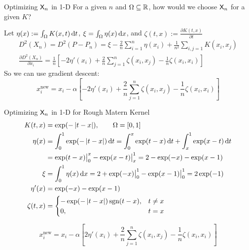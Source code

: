 \documentclass[10pt,compress,xcolor={usenames,dvipsnames},aspectratio=169]{beamer}
\begin{document}
\begin{frame}{Optimizing $\mathsf{X}_n$ in 1-D}
	For a given $n$ and $\Omega \subseteq \mathbb{R}$, how would we choose $\mathsf{X}_n$ for a given $K$?  
	
	Let $\eta(x) := \int_\Omega K(x,t) \, {\rm d} t$, $\xi = \int_\Omega \eta(x) \, {\rm d} x$, and $\zeta(t,x) := \frac{\partial K(t,x)}{\partial t}$
	\begin{gather*}
		 D^2(X_n) = D^2(P-P_n) = \xi - \frac 2{n} \sum_{i=1}^n  \eta(x_i) + \frac 1{n^2} \sum_{i,j=1}K(x_i,x_j) \\
		 \frac{\partial D^2(X_n)}{\partial x_i} = \frac {1}{n} \left [- 2\eta'(x_i)  + \frac 2{n} \sum_{j =1}^n \zeta(x_i,x_j) - \frac 1{n} \zeta(x_i,x_i) \right]
	\end{gather*}
So we can use gradient descent:
\[
x_i^{\text{new}} = x_i - \alpha \left [- 2\eta'(x_i)  + \frac 2{n} \sum_{j =1}^n \zeta(x_i,x_j) - \frac 1{n} \zeta(x_i,x_i) \right]
\]
\end{frame}

\begin{frame}{Optimizing $\mathsf{X}_n$ in 1-D for Rough Matern Kernel}
	\begin{align*}
		K(t,x) &= \exp(-\left \lvert t-x \right \rvert), \qquad \Omega = [0,1] \\
		\eta(x) &= \int_0^1 \exp(-\left \lvert t-x \right \rvert) \, {\rm d} t = \int_0^x \exp(t-x) \, {\rm d} t +  \int_x^1 \exp(x - t) \, {\rm d} t \\
		& = \exp(t-x) \bigr \rvert_0^x - \exp(x - t) \bigr\rvert_x^1 = 2  - \exp(-x) - \exp(x-1) \\
		\xi &= \int_0^1 \eta(x) \, {\rm d} x =  2 + \exp(-x) \bigr \rvert_0^1 - \exp(x-1) \bigr \rvert_0^1 = 2 \exp(-1)  \\
		\eta'(x) &= \exp(-x)  - \exp(x-1) \\
		\zeta(t,x) & = \begin{cases} -\exp(-\left \lvert t-x \right \rvert) \operatorname{sgn}(t-x) ,& t \ne x\\
			0, & t = x
		\end{cases}
	\end{align*}
	
	\[
	x_i^{\text{new}} = x_i - \alpha \left [ 2\eta'(x_i)  + \frac 2{n} \sum_{j =1}^n \zeta(x_i,x_j) - \frac 1{n} \zeta(x_i,x_i) \right]
	\]
\end{frame}
\end{document}
